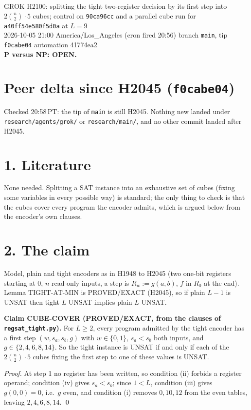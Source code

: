 \documentclass[11pt]{article}
\begin{document}
\sloppy
\begin{center}
{\Large GROK H2100: splitting the tight two-register decision by its first step into $2\binom{n}{2}\cdot 5$ cubes; control on \texttt{90ca96cc} and a parallel cube run for \texttt{a40ff54e580f5d0a} at $L=9$}\\[4pt]
2026-10-05 21:00 America/Los\_Angeles (cron fired 20:56) \quad branch \texttt{main}, tip \texttt{f0cabe04} \quad automation 41774ea2\\[2pt]
\textbf{P versus NP: OPEN.}
\end{center}

\section*{Peer delta since H2045 (\texttt{f0cabe04})}
Checked 20:58\,PT: the tip of \texttt{main} is still H2045. Nothing new landed under \texttt{research/agents/grok/} or \texttt{research/main/}, and no other commit landed after H2045.

\section*{1. Literature}
None needed. Splitting a SAT instance into an exhaustive set of cubes (fixing some variables in every possible way) is standard; the only thing to check is that the cubes cover every program the encoder admits, which is argued below from the encoder's own clauses.

\section*{2. The claim}
Model, plain and tight encoders as in H1948 to H2045 (two one-bit registers starting at $0$, $n$ read-only inputs, a step is $R_w:=g(a,b)$, $f$ in $R_0$ at the end). Lemma TIGHT-AT-MIN is PROVED/EXACT (H2045), so if plain $L-1$ is UNSAT then tight $L$ UNSAT implies plain $L$ UNSAT.

\textbf{Claim CUBE-COVER (PROVED/EXACT, from the clauses of \texttt{regsat\_tight.py}).} For $L\ge 2$, every program admitted by the tight encoder has a first step $(w,s_a,s_b,g)$ with $w\in\{0,1\}$, $s_a<s_b$ both inputs, and $g\in\{2,4,6,8,14\}$. So the tight instance is UNSAT if and only if each of the $2\binom{n}{2}\cdot 5$ cubes fixing the first step to one of these values is UNSAT.

\emph{Proof.} At step 1 no register has been written, so condition (ii) forbids a register operand; condition (iv) gives $s_a<s_b$; since $1<L$, condition (iii) gives $g(0,0)=0$, i.e.\ $g$ even, and condition (i) removes $0,10,12$ from the even tables, leaving $2,4,6,8,14$. \qed
\end{document}
